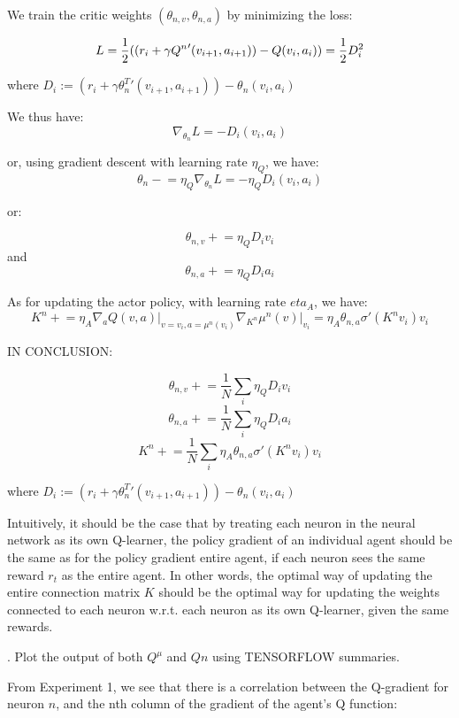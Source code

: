 We train the critic weights $(\theta_{n,v}, \theta_{n,a})$ by minimizing the loss:

$$L = \frac{1}{2}((r_i + \gamma {Q^n}'(v_{i+1}, a_{i+1})) -  Q(v_{i}, a_{i})) \\
= \frac{1}{2}D_i^2$$


where $D_i := (r_i + \gamma {\theta_n^T}' (v_{i+1}, a_{i+1})) - \theta_n (v_{i}, a_{i}) $

We thus have:
$$\nabla_{\theta_n} L = -D_i (v_{i}, a_{i})$$

or, using gradient descent with learning rate $\eta_Q$, we have:
$$\theta_n \mathrel{-}= \eta_Q \nabla_{\theta_n} L = -\eta_Q D_i (v_{i}, a_{i})$$

or:

$$\theta_{n,v} \mathrel{+}= \eta_Q D_i v_i$$
and
$$\theta_{n,a} \mathrel{+}= \eta_Q D_i a_i$$

As for updating the actor policy, with learning rate $eta_A$, we have:
$$K^n \mathrel{+}= \eta_A \nabla_a Q(v, a) \vert_{v=v_i, a=\mu^n(v_i)} \nabla_{K^n} \mu^n(v) \vert_{v_i} = \eta_A \theta_{n,a} \sigma'(K^n v_i) v_i$$

IN CONCLUSION:

$$\theta_{n,v} \mathrel{+}= \frac{1}{N} \sum_i \eta_Q D_i v_i$$
$$\theta_{n,a} \mathrel{+}= \frac{1}{N} \sum_i \eta_Q D_i a_i$$
$$K^n \mathrel{+}= \frac{1}{N} \sum_i \eta_A \theta_{n,a} \sigma'(K^n v_i) v_i$$

where $D_i := (r_i + \gamma {\theta_n^T}' (v_{i+1}, a_{i+1})) - \theta_n (v_{i}, a_{i}) $






Intuitively, it should be the case that by treating each neuron in the neural network as its own Q-learner, the policy gradient of an individual agent should be the same as for the policy gradient entire agent, if each neuron sees the same reward $r_t$ as the entire agent. In other words, the optimal way of updating the entire connection matrix $K$ should be the optimal way for updating the weights connected to each neuron w.r.t. each neuron as its own Q-learner, given the same rewards.


. Plot the output of both $Q^\mu$ and $Qn$ using TENSORFLOW summaries.

From Experiment 1, we see that there is a correlation between the Q-gradient for neuron $n$, and the nth column of the gradient of the agent's Q function:

